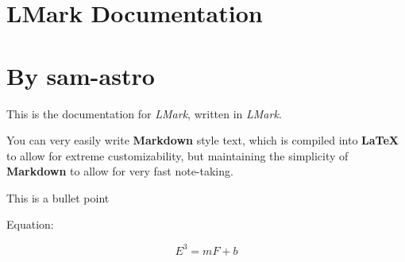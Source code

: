 \documentclass{article}
\begin{document}
\section*{\huge{LMark Documentation}}
\normalsize{}

\section*{\Large{By sam-astro}}
\normalsize{}


This is the documentation for \textit{LMark}, written in \textit{LMark}.

You can very easily write \textbf{Markdown} style text, which is compiled into \textbf{LaTeX} to allow for extreme customizability, but maintaining the simplicity of \textbf{Markdown} to allow for very fast note-taking.

\textit{} This is a bullet point

Equation:

$$E^3=mF+b$$
\end{document}
